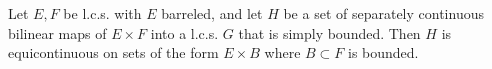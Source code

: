 Let $E, F$ be l.c.s. with $E$ barreled, and let $H$ be a set of separately continuous bilinear maps of $E \times F$ into a l.c.s. $G$ that is simply bounded. Then $H$ is equicontinuous on sets of the form $E \times B$ where $B \subset F$ is bounded.
